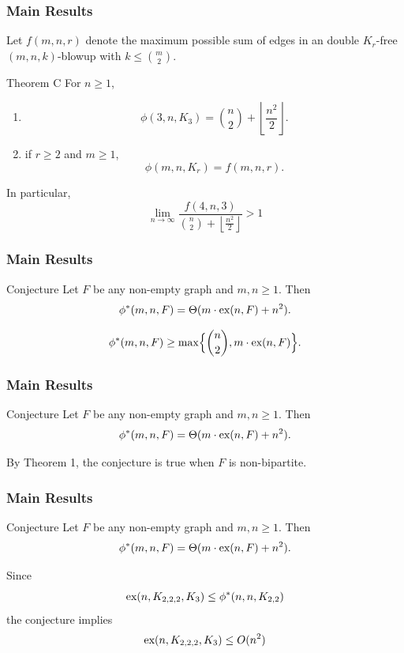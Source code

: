 \documentclass{beamer}
\newcommand*{\ex}{\textnormal{ex}}
\begin{document}
\begin{frame}

  \frametitle{Main Results}

  Let $f(m, n, r)$ denote the maximum possible sum of edges in an double $K_r$-free $(m, n, k)$-blowup with $k \leq \binom{m}{2}$.

  \pause

  \begin{block}{Theorem C}
    For $n \geq 1$,
    \begin{enumerate}
      \item 
      \[
        \phi(3, n, K_3) = \binom{n}{2} + \left\lfloor \frac{n^2}{2} \right\rfloor.
      \]
      \item if $r \geq 2$ and $m \geq 1$,
      \[
        \phi(m, n, K_r) = f(m, n, r).
      \]
    \end{enumerate}
    In particular,
    \[
      \lim_{n \to \infty} \frac{f(4, n, 3)}{\binom{n}{2} + \left\lfloor \frac{n^2}{2} \right\rfloor} > 1
    \]
  \end{block}
\end{frame}

\begin{frame}
  \frametitle{Main Results}

  \begin{block}{Conjecture}
    Let $F$ be any non-empty graph and $m, n \geq 1$. Then
    \[ 
      \phi^*(m,n,F) = \Theta(m \cdot \ex(n,F) + n^2).
    \]
  \end{block}

  \pause

  \vspace{0.3cm}

  \[ 
    \phi^*(m,n,F) \geq \max\Bigl\{\binom{n}{2},m\cdot \ex(n,F)\Bigr\}.
  \]
\end{frame}

\begin{frame}
  \frametitle{Main Results}

  \begin{block}{Conjecture}
    Let $F$ be any non-empty graph and $m, n \geq 1$. Then
    \[ 
      \phi^*(m,n,F) = \Theta(m \cdot \ex(n,F) + n^2).
    \]
  \end{block}

  \vspace{0.5cm}

  By Theorem 1, the conjecture is true when $F$ is non-bipartite.
\end{frame}

\begin{frame}
  \frametitle{Main Results}

  \begin{block}{Conjecture}
    Let $F$ be any non-empty graph and $m, n \geq 1$. Then
    \[ 
      \phi^*(m,n,F) = \Theta(m \cdot \ex(n,F) + n^2).
    \]
  \end{block}

  \vspace{0.3cm}

  Since
  \[
    \ex(n, K_{2, 2, 2}, K_3) \leq \phi^*(n, n, K_{2, 2})
  \]
  the conjecture implies
  \[
    \ex(n, K_{2, 2, 2}, K_3) \leq O(n^{2})
  \]
\end{frame}
\end{document}
